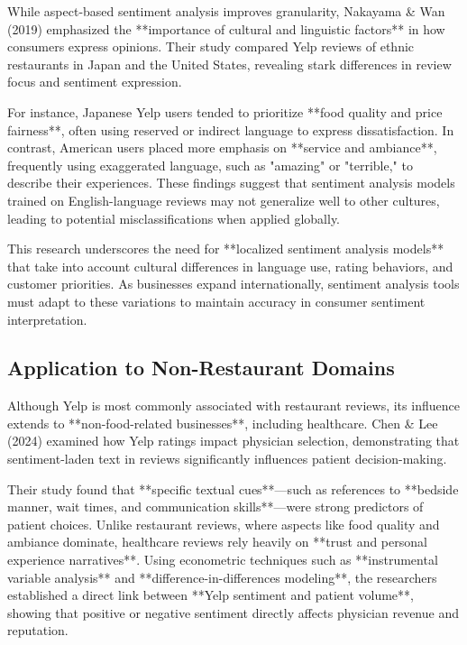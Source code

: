 \documentclass{article}
\begin{document}
While aspect-based sentiment analysis improves granularity, Nakayama \& Wan (2019)\cite{NakayamaWan2019} emphasized the **importance of cultural and linguistic factors** in how consumers express opinions. Their study compared Yelp reviews of ethnic restaurants in Japan and the United States, revealing stark differences in review focus and sentiment expression.

For instance, Japanese Yelp users tended to prioritize **food quality and price fairness**, often using reserved or indirect language to express dissatisfaction. In contrast, American users placed more emphasis on **service and ambiance**, frequently using exaggerated language, such as "amazing" or "terrible," to describe their experiences. These findings suggest that sentiment analysis models trained on English-language reviews may not generalize well to other cultures, leading to potential misclassifications when applied globally.

This research underscores the need for **localized sentiment analysis models** that take into account cultural differences in language use, rating behaviors, and customer priorities. As businesses expand internationally, sentiment analysis tools must adapt to these variations to maintain accuracy in consumer sentiment interpretation.

\subsection{Application to Non-Restaurant Domains}

Although Yelp is most commonly associated with restaurant reviews, its influence extends to **non-food-related businesses**, including healthcare. Chen \& Lee (2024)\cite{ChenLee2024UPRa} examined how Yelp ratings impact physician selection, demonstrating that sentiment-laden text in reviews significantly influences patient decision-making.

Their study found that **specific textual cues**—such as references to **bedside manner, wait times, and communication skills**—were strong predictors of patient choices. Unlike restaurant reviews, where aspects like food quality and ambiance dominate, healthcare reviews rely heavily on **trust and personal experience narratives**. Using econometric techniques such as **instrumental variable analysis** and **difference-in-differences modeling**, the researchers established a direct link between **Yelp sentiment and patient volume**, showing that positive or negative sentiment directly affects physician revenue and reputation.
\end{document}
